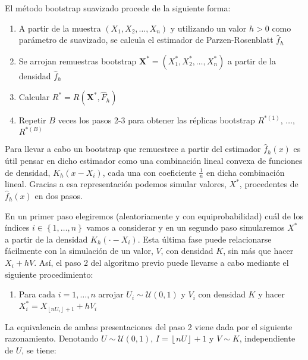 \documentclass[]{book}
\providecommand{\tightlist}{%
  \setlength{\itemsep}{0pt}\setlength{\parskip}{0pt}}
\theoremstyle{break}
\theoremstyle{definition}
\theoremstyle{definition}
\theoremstyle{definition}
\theoremstyle{remark}
\begin{document}
El método bootstrap suavizado procede de la siguiente forma:

\begin{enumerate}
\def\labelenumi{\arabic{enumi}.}
\item
  A partir de la muestra \(\left( X_1,X_2,\ldots ,X_n \right)\) y
  utilizando un valor \(h>0\) como parámetro de suavizado, se calcula el
  estimador de Parzen-Rosenblatt \(\hat{f}_{h}\)
\item
  Se arrojan remuestras bootstrap
  \(\mathbf{X}^{\ast}=\left( X_1^{\ast},X_2^{\ast},\ldots ,X_n^{\ast} \right)\)
  a partir de la densidad \(\hat{f}_{h}\)
\item
  Calcular \(R^{\ast}=R\left( \mathbf{X}^{\ast},\hat{F}_{h} \right)\)
\item
  Repetir \(B\) veces los pasos 2-3 para obtener las réplicas bootstrap
  \(R^{\ast (1)}\), \(\ldots\), \(R^{\ast (B)}\)
\end{enumerate}

Para llevar a cabo un bootstrap que remuestree a partir del estimador
\(\hat{f}_{h}\left( x \right)\) es útil pensar en dicho estimador como
una combinación lineal convexa de funciones de densidad,
\(K_{h}\left( x-X_i \right)\), cada una con coeficiente \(\frac{1}{n}\)
en dicha combinación lineal. Gracias a esa representación podemos
simular valores, \(X^{\ast}\), procedentes de
\(\hat{f}_{h}\left( x \right)\) en dos pasos.

En un primer paso elegiremos (aleatoriamente y con equiprobabilidad)
cuál de los índices \(i\in \left\{ 1,\ldots ,n\right\}\) vamos a
considerar y en un segundo paso simularemos \(X^{\ast}\) a partir de la
densidad \(K_{h}\left( \cdot -X_i \right)\). Esta última fase puede
relacionarse fácilmente con la simulación de un valor, \(V\), con
densidad \(K\), sin más que hacer \(X_i+hV\). Así, el paso 2 del
algoritmo previo puede llevarse a cabo mediante el siguiente
procedimiento:

\begin{enumerate}
\def\labelenumi{\arabic{enumi}.}
\setcounter{enumi}{1}
\tightlist
\item
  Para cada \(i=1,\ldots ,n\) arrojar
  \(U_i\sim \mathcal{U}\left( 0,1 \right)\) y \(V_i\) con densidad \(K\)
  y hacer \(X_i^{\ast}=X_{\left\lfloor nU_i\right\rfloor +1}+hV_i\)
\end{enumerate}

La equivalencia de ambas presentaciones del paso 2 viene dada por el
siguiente razonamiento. Denotando
\(U\sim \mathcal{U}\left( 0,1 \right)\),
\(I=\left\lfloor nU\right\rfloor +1\) y \(V\sim K\), independiente de
\(U\), se tiene:
\end{document}
